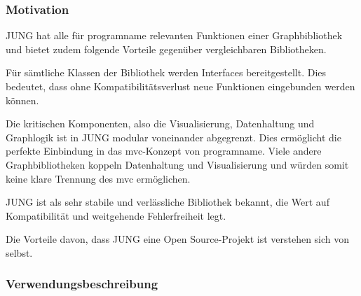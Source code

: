 \subsubsection{Motivation}
JUNG hat alle für \gls{programname} relevanten Funktionen einer Graphbibliothek und bietet zudem folgende Vorteile gegenüber vergleichbaren Bibliotheken. 

Für sämtliche Klassen der Bibliothek werden Interfaces bereitgestellt. Dies bedeutet, dass ohne Kompatibilitätsverlust neue Funktionen eingebunden werden können. 

Die kritischen Komponenten, also die Visualisierung, Datenhaltung und Graphlogik ist in JUNG modular voneinander abgegrenzt. Dies ermöglicht die perfekte Einbindung in das \gls{mvc}-Konzept von \gls{programname}. Viele andere Graphbibliotheken koppeln Datenhaltung und Visualisierung und würden somit keine klare Trennung des \gls{mvc} ermöglichen. 

JUNG ist als sehr stabile und verlässliche Bibliothek bekannt, die Wert auf Kompatibilität und weitgehende Fehlerfreiheit legt. 

Die Vorteile davon, dass JUNG eine Open Source-Projekt ist verstehen sich von selbst. 

\subsubsection{Verwendungsbeschreibung}


